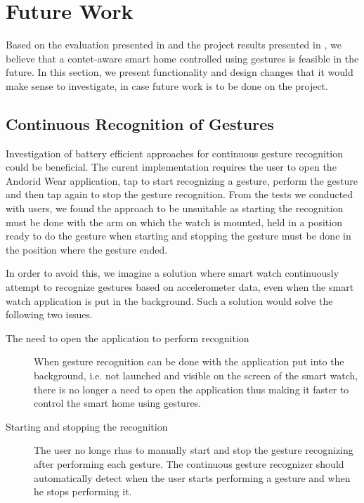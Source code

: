 \section{Future Work}
\label{sec:conclusion:future-work}

Based on the evaluation presented in  and the project results presented in , we believe that a contet-aware smart home controlled using gestures is feasible in the future. 
In this section, we present functionality and design changes that it would make sense to investigate, in case future work is to be done on the project.

\subsection{Continuous Recognition of Gestures}

Investigation of battery efficient approaches for continuous gesture recognition could be beneficial. The curent implementation requires the user to open the Andorid Wear application, tap to start recognizing a gesture, perform the gesture and then tap again to stop the gesture recognition. From the tests we conducted with users, we found the approach to be unsuitable as starting the recognition must be done with the arm on which the watch is mounted, held in a position ready to do the gesture when starting and stopping the gesture must be done in the position where the gesture ended.

In order to avoid this, we imagine a solution where smart watch continuously attempt to recognize gestures based on accelerometer data, even when the smart watch application is put in the background. Such a solution would solve the following two issues.

\begin{description}
\item[The need to open the application to perform recognition] When gesture recognition can be done with the application put into the background, i.e. not launched and visible on the screen of the smart watch, there is no longer a need to open the application thus making it faster to control the smart home using gestures.
\item[Starting and stopping the recognition] The user no longe rhas to manually start and stop the gesture recognizing after performing each gesture. The continuous gesture recognizer should automatically detect when the user starts performing a gesture and when he stops performing it.
\end{description}

